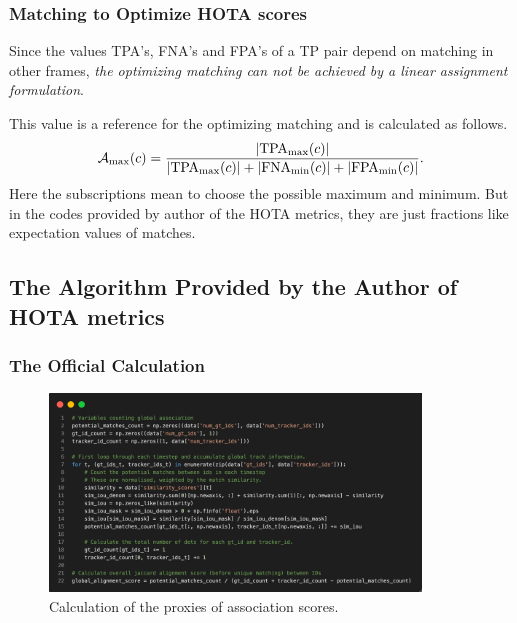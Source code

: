 \documentclass[slidetop, mathserif]{beamer}
\begin{document}
\begin{frame}
	\frametitle{Matching to Optimize HOTA scores}
	
	Since the values TPA's, FNA's and FPA's of a TP pair depend on matching in other frames,
	\emph{the optimizing matching can not be achieved by a linear assignment formulation}.
	
	\vspace{5pt}
	
	This value is a reference for the optimizing matching and is calculated as follows.
	\[
		\mathcal A_{\rm max}(c) = 
		\dfrac{|\text{TPA}_{\rm max}(c)|}{|\text{TPA}_{\rm max}(c)|+|\text{FNA}_{\rm min}(c)|+|\text{FPA}_{\rm min}(c)|}.
	\]
	Here the subscriptions mean to choose the possible maximum and minimum.
	But in the codes provided by author of the HOTA metrics, 
	they are just fractions like expectation values of matches.
	
\end{frame}

\subsection{The Algorithm Provided by the Author of HOTA metrics}

\begin{frame}
	\frametitle{The Official Calculation}
	\begin{figure}
		\includegraphics[width=280pt]{pics/fig10.png}
		\caption{Calculation of the proxies of association scores.}
	\end{figure}
\end{frame}
\end{document}
